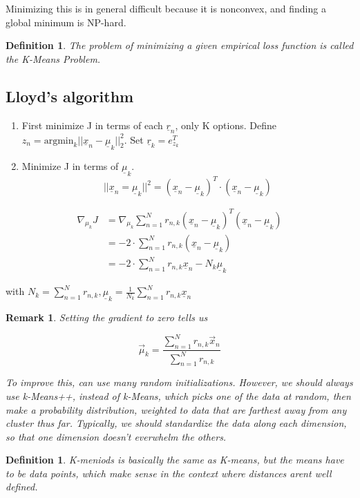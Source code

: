 \documentclass{amsart}
\newtheorem{defn}[subsubsection]{Definition}
\newtheorem{rem}[subsubsection]{Remark}
\newcommand\ssec{\subsection}
\begin{document}
Minimizing this is in general difficult because it is nonconvex, and finding a global minimum is NP-hard.
\begin{defn} The problem of minimizing a given empirical loss function is called the K-Means Problem. \end{defn}

\ssec{Lloyd's algorithm}
\begin{enumerate}
\item First minimize J in terms of each $\underline r_n$, only K options. Define $z_n = \text{argmin}_k ||\underline x_n - \underline \mu_k||_2^2$. Set $\underline r_k = e_{z_k}^T$
\item Minimize J in terms of $\underline \mu_k$.
$$|| \underline x_n = \underline \mu_k || ^2 = (\underline x_n - \underline \mu_k)^T \cdot (\underline x_n - \underline \mu_k)$$
\end{enumerate}

\begin{align*}
\nabla_{\mu_k} J &= \nabla_{\mu_k} \sum_{n=1}^N r_{n,k}(\underline x_n - \underline \mu_k)^T(\underline x_n - \underline \mu_k) 
\\
&= -2\cdot \sum_{n=1}^N r_{n,k}(\underline x_n - \underline \mu_k)
\\
&= -2\cdot\sum_{n=1}^N r_{n,k}\underline x_n - N_k \underline\mu_k
\end{align*}

with $N_k=\sum_{n=1}^N r_{n,k}, \underline \mu_k = \frac 1 {N_k} \sum_{n=1}^N r_{n,k} \underline x_n$

\begin{rem}
Setting the gradient to zero tells us

$$\vec \mu_k = \frac{\sum_{n=1}^N r_{n,k} \vec x_n}{\sum_{n=1}^N r_{n,k}}$$

To improve this, can use many random initializations. However, we should always use k-Means++, instead of k-Means, which picks one of the data at random, then make a probability distribution, weighted to data that are farthest away from any cluster thus far.
Typically, we should standardize the data along each dimension, so that one dimension doesn't everwhelm the others.
\end{rem}

\begin{defn} K-meniods is basically the same as K-means, but the means have to be data points, which make sense in the context where distances arent well defined.\end{defn}
\end{document}

